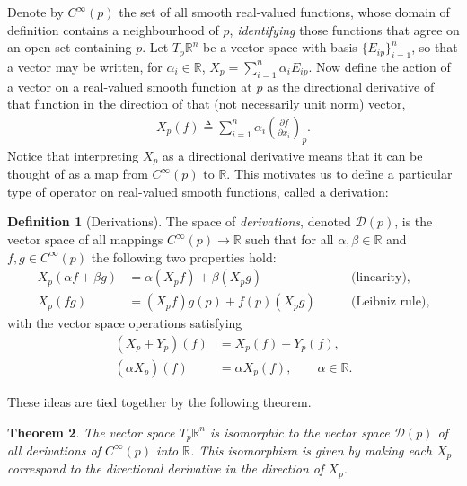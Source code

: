 \documentclass[psamsfonts]{amsart}
\newtheorem{thm}{Theorem}[section]
\theoremstyle{definition}
\newtheorem{defn}[thm]{Definition}
\theoremstyle{remark}
\newcommand*\R{\mathds{R}}
\numberwithin{equation}{section}
\begin{document}
Denote by $C^{\infty}(p)$ the set of all smooth real-valued functions, whose domain of definition contains a neighbourhood of $p$, \textit{identifying} those functions that agree on an open set containing $p$. Let $T_p\R^n$ be a vector space with basis $\{E_{ip}\}_{i=1}^{n}$, so that a vector may be written, for $\alpha_i \in \R$, $X_p = \sum_{i = 1}^n \alpha_i E_{ip}$. Now define the action of a vector on a real-valued smooth function at $p$ as the directional derivative of that function in the direction of that (not necessarily unit norm) vector, 
\begin{equation}
\begin{aligned}
X_p(f) \triangleq \sum_{i = 1}^n \alpha_i \left(\frac{\partial f}{\partial x_i}\right)_p.
\end{aligned}
\end{equation}
Notice that interpreting $X_p$ as a directional derivative means that it can be thought of as a map from $C^{\infty}(p)$ to $\R$. This motivates us to define a particular type of operator on real-valued smooth functions, called a {derivation}:
\begin{defn}[Derivations]\label{def:derivations}
The space of \textit{derivations}, denoted $\mathscr{D}(p)$, is the vector space of all mappings $C^{\infty}(p)\rightarrow \R$ such that for all $\alpha, \beta \in \R$ and $f, g \in C^{\infty}(p)$ the following two properties hold:
\begin{equation}\label{eq:linleibniz}
\begin{aligned}
X_p(\alpha f + \beta g) & = {} \alpha (X_p f) + \beta (X_p g) \qquad & \text{(linearity)},\\
X_p(fg) & = {} (X_p f)g(p) + f(p)(X_p g) \qquad & \text{(Leibniz rule)},
\end{aligned}
\end{equation}
with the vector space operations satisfying 
\begin{equation}
\begin{aligned}
(X_p+Y_p)(f) &={} X_p(f) +Y_p(f), \\
(\alpha X_p)(f) &={}\alpha X_p (f), \qquad \alpha \in \R.
 \end{aligned}
 \end{equation}
\end{defn}
These ideas are tied together by the following theorem. 
\begin{thm}
The vector space $T_p\R^n$ is isomorphic to the vector space $\mathscr{D}(p)$ of all derivations of $C^{\infty}(p)$ into $\R$. This isomorphism is given by making each $X_p$ correspond to the directional derivative in the direction of $X_p$. 
\end{thm}
\end{document}
